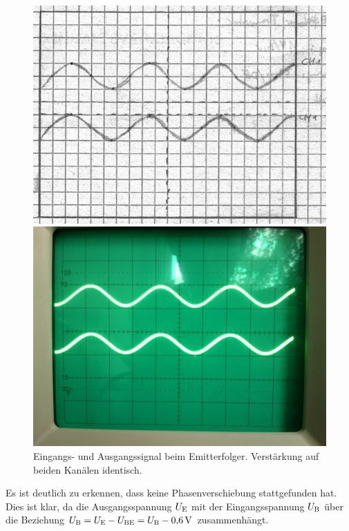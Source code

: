 \begin{figure}
	\centering
	\begin{minipage}{.45\linewidth}
		\includegraphics[width=\linewidth]{Oszi_Hand/3-07.jpg}
	\end{minipage}
	\hfill
	\begin{minipage}{.45\linewidth}
		\includegraphics[width=\linewidth]{Oszi_Foto/3-07.jpg}
	\end{minipage}
	\caption{%
		Eingangs- und Ausgangssignal beim Emitterfolger. Verstärkung auf beiden
	Kanälen identisch.
	}
	\label{fig:7}
\end{figure}

Es ist deutlich zu erkennen, dass keine Phasenverschiebung stattgefunden hat.
Dies ist klar, da die Ausgangsspannung $U_\text{E}$ mit der Eingangsspannung $U_\text{B}$
über die Beziehung $U_\text{B} = U_\text{E} - U_\text{BE} = U_\text{B} - \SI {0.6}{\volt}$ zusammenhängt.

